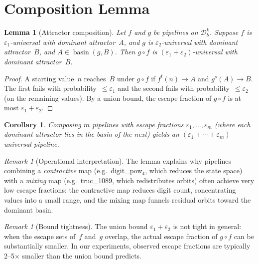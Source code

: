 \documentclass[11pt,a4paper]{amsart}
\theoremstyle{plain}
\newtheorem{corollary}[theorem]{Corollary}
\newtheorem{lemma}[theorem]{Lemma}
\theoremstyle{definition}
\theoremstyle{remark}
\newtheorem{remark}[theorem]{Remark}
\DeclareMathOperator{\basin}{basin}
\begin{document}
\section{Composition Lemma}\label{sec:composition}

\begin{lemma}[Attractor composition]\label{lem:composition}
Let $f$ and $g$ be pipelines on $\mathcal{D}_b^k$. Suppose $f$ is
$\varepsilon_1$-universal with dominant attractor~$A$, and $g$ is
$\varepsilon_2$-universal with dominant attractor~$B$, and
$A \in \basin(g, B)$. Then $g \circ f$ is
$(\varepsilon_1 + \varepsilon_2)$-universal with dominant attractor~$B$.
\end{lemma}

\begin{proof}
A starting value~$n$ reaches~$B$ under $g \circ f$ if $f^t(n) \to A$ and
$g^s(A) \to B$. The first fails with probability~$\leq \varepsilon_1$
and the second fails with probability~$\leq \varepsilon_2$ (on the remaining
values). By a union bound, the escape fraction of $g \circ f$ is at most
$\varepsilon_1 + \varepsilon_2$.
\end{proof}

\begin{corollary}\label{cor:chain}
Composing $m$ pipelines with escape fractions $\varepsilon_1, \ldots,
\varepsilon_m$ (where each dominant attractor lies in the basin of the next)
yields an $(\varepsilon_1 + \cdots + \varepsilon_m)$-universal pipeline.
\end{corollary}

\begin{remark}[Operational interpretation]
The lemma explains why pipelines combining a \emph{contractive} map
(e.g.\ digit\_pow$_4$, which reduces the state space) with a \emph{mixing}
map (e.g.\ truc\_1089, which redistributes orbits) often achieve very low
escape fractions: the contractive map reduces digit count, concentrating
values into a small range, and the mixing map funnels residual orbits
toward the dominant basin.
\end{remark}

\begin{remark}[Bound tightness]
The union bound $\varepsilon_1 + \varepsilon_2$ is not tight in general:
when the escape sets of~$f$ and~$g$ overlap, the actual escape fraction of
$g \circ f$ can be substantially smaller. In our experiments, observed escape
fractions are typically 2--5$\times$ smaller than the union bound predicts.
\end{remark}
\end{document}
